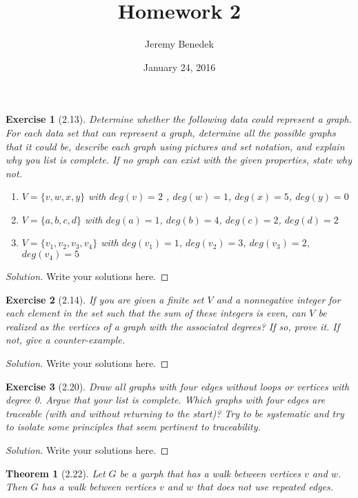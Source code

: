 \documentclass{article}
\title{Homework 2}
\author{Jeremy Benedek}
\date{January 24, 2016}
\newtheorem*{thm}{Theorem}
\newtheorem*{ex}{Exercise}
\newenvironment{solution}
  {\begin{proof}[Solution]}
  {\renewcommand{\qedsymbol}{}\end{proof}}
\begin{document}
\maketitle

\begin{ex}[2.13]
	Determine whether the following data could represent a graph. For each data set that \textit{can} represent a graph, determine \textit{all} the possible graphs that it could be, describe each graph using pictures
	and set notation, and explain why you list is complete. If no graph can exist with the given properties, state why not. 
	\begin{enumerate} 
	  \item $V = \{v,w,x,y\}$ with $deg(v) = 2$ , $deg(w) = 1$, $deg(x) = 5$, $deg(y) = 0$
          \item $V = \{a,b,c,d\}$ with $deg(a) = 1$, $deg(b) = 4$, $deg(c) = 2$, $deg(d) = 2$
          \item $V = \{v_1,v_2,v_3,v_4\}$ with $deg(v_1) = 1$, $deg(v_2) = 3$, $deg(v_3) = 2$, $deg(v_4) = 5$
       \end{enumerate}
\end{ex}
\begin{solution}
    Write your solutions here.
\end{solution}

\begin{ex}[2.14]
	If you are given a finite set $V$ and a nonnegative integer for each element in the set such that the sum of these integers is even, can $V$ be realized as the vertices of a graph with the associated degrees? 
	If so, prove it. If not, give a counter-example.
\end{ex}
\begin{solution}
    Write your solutions here.
\end{solution}

\begin{ex}[2.20]
	Draw all graphs with four edges without loops or vertices with degree 0. Argue that your list is complete. Which graphs with four edges are traceable (with and without returning to the start)? 
	Try to be systematic and try to isolate some principles that seem pertinent to traceability.
\end{ex}
\begin{solution}
    Write your solutions here.
\end{solution}


\begin{thm}[2.22]
	Let $G$ be a garph that has a walk between vertices $v$ and $w$. Then $G$ has a walk between vertices $v$ and $w$ that does not use repeated edges. \end{thm}
\end{document}
